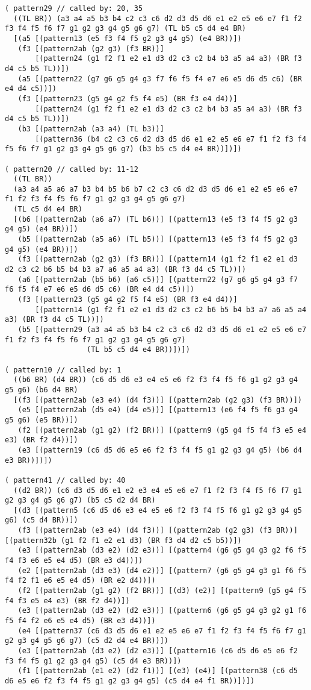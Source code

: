 {\begin{verbatim}
( pattern29 // called by: 20, 35
  ((TL BR)) (a3 a4 a5 b3 b4 c2 c3 c6 d2 d3 d5 d6 e1 e2 e5 e6 e7 f1 f2 f3 f4 f5 f6 f7 g1 g2 g3 g4 g5 g6 g7) (TL b5 c5 d4 e4 BR)
  [(a5 [(pattern13 (e5 f3 f4 f5 g2 g3 g4 g5) (e4 BR))])
   (f3 [(pattern2ab (g2 g3) (f3 BR))]
       [(pattern24 (g1 f2 f1 e2 e1 d3 d2 c3 c2 b4 b3 a5 a4 a3) (BR f3 d4 c5 b5 TL))])
   (a5 [(pattern22 (g7 g6 g5 g4 g3 f7 f6 f5 f4 e7 e6 e5 d6 d5 c6) (BR e4 d4 c5))])
   (f3 [(pattern23 (g5 g4 g2 f5 f4 e5) (BR f3 e4 d4))]
       [(pattern24 (g1 f2 f1 e2 e1 d3 d2 c3 c2 b4 b3 a5 a4 a3) (BR f3 d4 c5 b5 TL))])
   (b3 [(pattern2ab (a3 a4) (TL b3))]
       [(pattern36 (b4 c2 c3 c6 d2 d3 d5 d6 e1 e2 e5 e6 e7 f1 f2 f3 f4 f5 f6 f7 g1 g2 g3 g4 g5 g6 g7) (b3 b5 c5 d4 e4 BR))])])

( pattern20 // called by: 11-12
  ((TL BR))
  (a3 a4 a5 a6 a7 b3 b4 b5 b6 b7 c2 c3 c6 d2 d3 d5 d6 e1 e2 e5 e6 e7 f1 f2 f3 f4 f5 f6 f7 g1 g2 g3 g4 g5 g6 g7)
  (TL c5 d4 e4 BR)
  [(b6 [(pattern2ab (a6 a7) (TL b6))] [(pattern13 (e5 f3 f4 f5 g2 g3 g4 g5) (e4 BR))])
   (b5 [(pattern2ab (a5 a6) (TL b5))] [(pattern13 (e5 f3 f4 f5 g2 g3 g4 g5) (e4 BR))])
   (f3 [(pattern2ab (g2 g3) (f3 BR))] [(pattern14 (g1 f2 f1 e2 e1 d3 d2 c3 c2 b6 b5 b4 b3 a7 a6 a5 a4 a3) (BR f3 d4 c5 TL))])
   (a6 [(pattern2ab (b5 b6) (a6 c5))] [(pattern22 (g7 g6 g5 g4 g3 f7 f6 f5 f4 e7 e6 e5 d6 d5 c6) (BR e4 d4 c5))])
   (f3 [(pattern23 (g5 g4 g2 f5 f4 e5) (BR f3 e4 d4))]
       [(pattern14 (g1 f2 f1 e2 e1 d3 d2 c3 c2 b6 b5 b4 b3 a7 a6 a5 a4 a3) (BR f3 d4 c5 TL))])
   (b5 [(pattern29 (a3 a4 a5 b3 b4 c2 c3 c6 d2 d3 d5 d6 e1 e2 e5 e6 e7 f1 f2 f3 f4 f5 f6 f7 g1 g2 g3 g4 g5 g6 g7) 
                   (TL b5 c5 d4 e4 BR))])])

( pattern10 // called by: 1
  ((b6 BR) (d4 BR)) (c6 d5 d6 e3 e4 e5 e6 f2 f3 f4 f5 f6 g1 g2 g3 g4 g5 g6) (b6 d4 BR)
  [(f3 [(pattern2ab (e3 e4) (d4 f3))] [(pattern2ab (g2 g3) (f3 BR))])
   (e5 [(pattern2ab (d5 e4) (d4 e5))] [(pattern13 (e6 f4 f5 f6 g3 g4 g5 g6) (e5 BR))])
   (f2 [(pattern2ab (g1 g2) (f2 BR))] [(pattern9 (g5 g4 f5 f4 f3 e5 e4 e3) (BR f2 d4))])
   (e3 [(pattern19 (c6 d5 d6 e5 e6 f2 f3 f4 f5 g1 g2 g3 g4 g5) (b6 d4 e3 BR))])])

( pattern41 // called by: 40
  ((d2 BR)) (c6 d3 d5 d6 e1 e2 e3 e4 e5 e6 e7 f1 f2 f3 f4 f5 f6 f7 g1 g2 g3 g4 g5 g6 g7) (b5 c5 d2 d4 BR)
  [(d3 [(pattern5 (c6 d5 d6 e3 e4 e5 e6 f2 f3 f4 f5 f6 g1 g2 g3 g4 g5 g6) (c5 d4 BR))])
   (f3 [(pattern2ab (e3 e4) (d4 f3))] [(pattern2ab (g2 g3) (f3 BR))] [(pattern32b (g1 f2 f1 e2 e1 d3) (BR f3 d4 d2 c5 b5))])
   (e3 [(pattern2ab (d3 e2) (d2 e3))] [(pattern4 (g6 g5 g4 g3 g2 f6 f5 f4 f3 e6 e5 e4 d5) (BR e3 d4))])
   (e2 [(pattern2ab (d3 e3) (d4 e2))] [(pattern7 (g6 g5 g4 g3 g1 f6 f5 f4 f2 f1 e6 e5 e4 d5) (BR e2 d4))])
   (f2 [(pattern2ab (g1 g2) (f2 BR))] [(d3) (e2)] [(pattern9 (g5 g4 f5 f4 f3 e5 e4 e3) (BR f2 d4))])
   (e3 [(pattern2ab (d3 e2) (d2 e3))] [(pattern6 (g6 g5 g4 g3 g2 g1 f6 f5 f4 f2 e6 e5 e4 d5) (BR e3 d4))])
   (e4 [(pattern37 (c6 d3 d5 d6 e1 e2 e5 e6 e7 f1 f2 f3 f4 f5 f6 f7 g1 g2 g3 g4 g5 g6 g7) (c5 d2 d4 e4 BR))])
   (e3 [(pattern2ab (d3 e2) (d2 e3))] [(pattern16 (c6 d5 d6 e5 e6 f2 f3 f4 f5 g1 g2 g3 g4 g5) (c5 d4 e3 BR))])
   (f1 [(pattern2ab (e1 e2) (d2 f1))] [(e3) (e4)] [(pattern38 (c6 d5 d6 e5 e6 f2 f3 f4 f5 g1 g2 g3 g4 g5) (c5 d4 e4 f1 BR))])])


\end{verbatim}}
